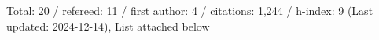 Total: 20 / refereed: 11 / first author: 4 / citations: 1,244 / h-index: 9 (Last updated: 2024-12-14), List attached below